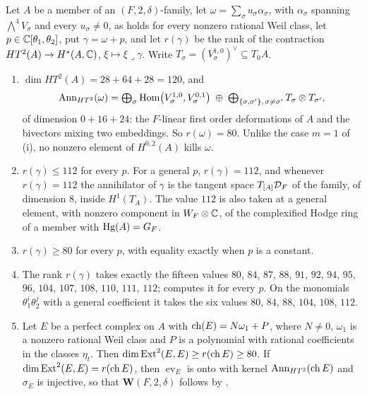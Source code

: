 \begin{theorem}[The polarised criterion for a quartic field at $n=2$]
\label{thm:quarticp2prime}
Let $A$ be a member of an $(F,2,\delta)$-family, let
$\omega=\sum_{\sigma}u_{\sigma}\alpha_{\sigma}$, with $\alpha_{\sigma}$ spanning
$\bigwedge^{4}V_{\sigma}$ and every $u_{\sigma}\ne0$, as holds for every
nonzero rational Weil class, let $p\in\mathbb{C}[\theta_{1},\theta_{2}]$, put
$\gamma=\omega+p$, and let $r(\gamma)$ be the rank of the contraction
$HT^{2}(A)\to H^{*}(A,\mathbb{C})$, $\xi\mapsto\xi\lrcorner\gamma$. Write
$T_{\sigma}=(V_{\sigma}^{1,0})^{\vee}\subseteq T_{0}A$.
\begin{enumerate}[label=\textup{(\roman*)},leftmargin=2.6em,itemsep=2pt]
\item $\dim HT^{2}(A)=28+64+28=120$, and
  \[
    \operatorname{Ann}_{HT^{2}}(\omega)=\textstyle\bigoplus_{\sigma}
    \operatorname{Hom}\bigl(V_{\sigma}^{1,0},V_{\sigma}^{0,1}\bigr)\;\oplus\;
    \bigoplus_{\{\sigma,\sigma'\},\,\sigma\ne\sigma'}T_{\sigma}\otimes T_{\sigma'},
  \]
  of dimension $0+16+24$: the $F$-linear first order deformations of $A$ and
  the bivectors mixing two embeddings. So $r(\omega)=80$. Unlike the case
  $m=1$ of (i), no nonzero element of $H^{0,2}(A)$ kills
  $\omega$.
\item $r(\gamma)\le112$ for every $p$. For a general $p$, $r(\gamma)=112$, and
  whenever $r(\gamma)=112$ the annihilator of $\gamma$ is the tangent space
  $T_{[A]}\mathcal{D}_{F}$ of the family, of dimension $8$, inside $H^{1}(T_{A})$. The
  value $112$ is also taken at a general element, with nonzero component in
  $W_{F}\otimes\mathbb{C}$, of the complexified Hodge ring of a member with
  $\operatorname{Hg}(A)=G_{F}$.
\item $r(\gamma)\ge80$ for every $p$, with equality exactly when $p$ is a
  constant.
\item The rank $r(\gamma)$ takes exactly the fifteen values $80$, $84$, $87$,
  $88$, $91$, $92$, $94$, $95$, $96$, $104$, $107$, $108$, $110$, $111$,
  $112$;  computes it for every $p$. On the monomials
  $\theta_{1}^{i}\theta_{2}^{j}$ with a general coefficient it takes the
  six values $80$, $84$, $88$, $104$, $108$, $112$.
\item Let $E$ be a perfect complex on $A$ with $\operatorname{ch}(E)=N\omega_{1}+P$, where
  $N\ne0$, $\omega_{1}$ is a nonzero rational Weil class and $P$ is a
  polynomial with rational coefficients in the classes $\eta_{t}$. Then
  $\dim\operatorname{Ext}^{2}(E,E)\ge r(\operatorname{ch} E)\ge80$. If $\dim\operatorname{Ext}^{2}(E,E)=r(\operatorname{ch} E)$, then
  $\operatorname{ev}_{E}$ is onto with kernel $\operatorname{Ann}_{HT^{2}}(\operatorname{ch} E)$ and
  $\sigma_{E}$ is injective, so that $\mathbf{W}(F,2,\delta)$ follows by
  \cite[Theorem~17.7(v)]{paperI}.
\end{enumerate}
\end{theorem}

